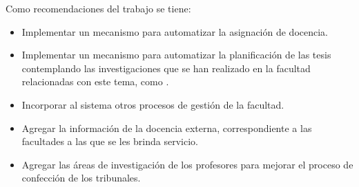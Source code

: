 \begin{conclusions}
\newpage
Como recomendaciones del trabajo se tiene:
\begin{itemize}
    \item Implementar un mecanismo para automatizar la asignación de docencia.
    \item Implementar un mecanismo para automatizar la planificación de las tesis contemplando 
    las investigaciones que se han realizado en la facultad relacionadas con este tema, como 
    \cite{tribunales}.
    \item Incorporar al sistema otros procesos de gestión de la facultad.
    \item Agregar la información de la docencia externa, correspondiente a las facultades a las que se les brinda servicio.
    \item Agregar las áreas de investigación de los profesores para mejorar el proceso de confección de los tribunales.
\end{itemize}

\end{conclusions}



